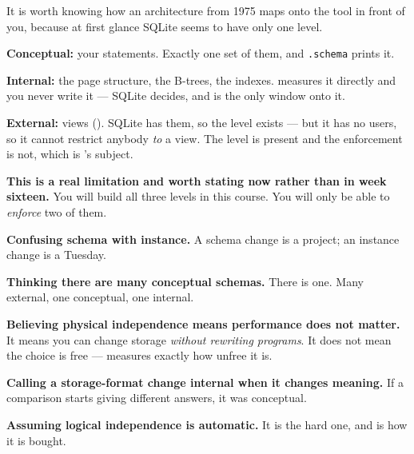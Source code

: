 \begin{alertbox}
It is worth knowing how an architecture from 1975 maps onto the tool in front
of you, because at first glance SQLite seems to have only one level.

\begin{tight}
  \item \textbf{Conceptual:} your  statements. Exactly one
        set of them, and \texttt{.schema} prints it.
  \item \textbf{Internal:} the page structure, the B-trees, the indexes.
         measures it directly and you never write it ---
        SQLite decides, and  is the only window onto it.
  \item \textbf{External:} views (). SQLite has them, so the
        level exists --- but it has no users, so it cannot restrict anybody
        \emph{to} a view. The level is present and the enforcement is not,
        which is 's subject.
\end{tight}

\smallskip
\textbf{This is a real limitation and worth stating now rather than in week
sixteen.} You will build all three levels in this course. You will only be
able to \emph{enforce} two of them.
\end{alertbox}

\begin{pitfall}
\begin{tight}
  \item \textbf{Confusing schema with instance.} A schema change is a project;
        an instance change is a Tuesday.
  \item \textbf{Thinking there are many conceptual schemas.} There is one. Many
        external, one conceptual, one internal.
  \item \textbf{Believing physical independence means performance does not
        matter.} It means you can change storage \emph{without rewriting
        programs}. It does not mean the choice is free --- 
        measures exactly how unfree it is.
  \item \textbf{Calling a storage-format change internal when it changes
        meaning.} If a comparison starts giving different answers, it was
        conceptual.
  \item \textbf{Assuming logical independence is automatic.} It is the hard
        one, and  is how it is bought.
\end{tight}
\end{pitfall}


